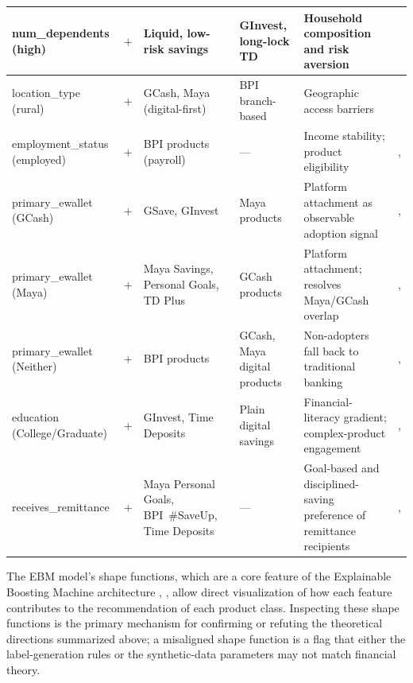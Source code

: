 \documentclass{icsthesis}
\begin{document}
\begin{mainmatter}
{\begin{xltabular}{\textwidth}{|>{\raggedright\arraybackslash}p{0.17\textwidth}|>{\centering\arraybackslash}p{0.06\textwidth}|X|X|X|>{\centering\arraybackslash}p{0.11\textwidth}|}
						\hline
						num\_\newline dependents (high) & $+$ & Liquid, low-risk savings & GInvest, long-lock TD & Household composition and risk aversion & \cite{ref55} \\
						\hline
						location\_type (rural) & $+$ & GCash, Maya (digital-first) & BPI branch-based & Geographic access barriers & \cite{ref35} \\
						\hline
						employment\_\newline status (employed) & $+$ & BPI products (payroll) & --- & Income stability; product eligibility & \cite{ref64}, \cite{ref41} \\
						\hline
						primary\_\newline ewallet (GCash) & $+$ & GSave, GInvest & Maya products & Platform attachment as observable adoption signal & \cite{ref9}, \cite{ref35} \\
						\hline
						primary\_\newline ewallet (Maya) & $+$ & Maya Savings, Personal Goals, TD Plus & GCash products & Platform attachment; resolves Maya/GCash overlap & \cite{ref9}, \cite{ref35} \\
						\hline
						primary\_ewallet (Neither) & $+$ & BPI products & GCash, Maya digital products & Non-adopters fall back to traditional banking & \cite{ref35}, \cite{ref66} \\
						\hline
						education (College/\newline Graduate) & $+$ & GInvest, Time Deposits & Plain digital savings & Financial-literacy gradient; complex-product engagement & \cite{ref43}, \cite{ref41} \\
						\hline
						receives\_\newline remittance & $+$ & Maya Personal Goals, BPI~\#SaveUp, Time Deposits & --- & Goal-based and disciplined-saving preference of remittance recipients & \cite{ref40}, \cite{ref63} \\
					\end{xltabular}\par}
					\vspace{4ex}

					The EBM model's shape functions, which are a core feature of the Explainable Boosting Machine architecture \cite{ref48}, \cite{ref49}, allow direct visualization of how each feature contributes to the recommendation of each product class. Inspecting these shape functions is the primary mechanism for confirming or refuting the theoretical directions summarized above; a misaligned shape function is a flag that either the label-generation rules or the synthetic-data parameters may not match financial theory.


\end{mainmatter}
\end{document}
